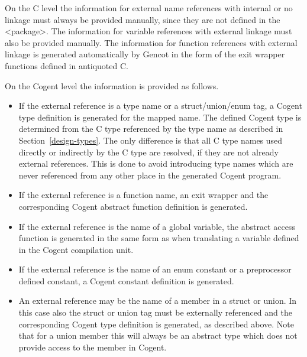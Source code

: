 On the C level the information for external name references with internal or no linkage must always be provided manually,
since they are not defined in the <package>. The information for variable references with external linkage must also be provided
manually. The information for function references with external linkage is generated automatically by Gencot in the 
form of the exit wrapper functions defined in antiquoted C. 

On the Cogent level the information is provided as follows.
\begin{itemize}
\item If the external reference is a type name or a struct/union/enum tag, a Cogent type definition is generated for the mapped name.
The defined Cogent type is determined
from the C type referenced by the type name as described in Section~\ref{design-types}. The only difference is that all C type
names used directly or indirectly by the C type are resolved, if they are not already external references. This is done to avoid 
introducing type names which are never referenced from any other place in the generated Cogent program. 
\item If the external reference is a function name, an exit wrapper and the corresponding Cogent abstract function 
definition is generated.
\item If the external reference is the name of a global variable, the abstract access function is generated in the same 
form as when translating a variable defined in the Cogent compilation unit.
\item If the external reference is the name of an enum constant or a preprocessor defined constant, a Cogent constant definition 
is generated.
\item An external reference may be the name of a member in a struct or union. In this case also the struct or union tag must
be externally referenced and the corresponding Cogent type definition is generated, as described above. Note that for a union
member this will always be an abstract type which does not provide access to the member in Cogent.
\end{itemize}
